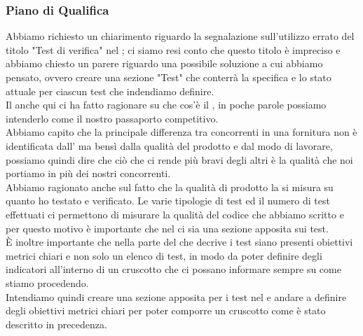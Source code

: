 	
	\subsubsection*{Piano di Qualifica}
	Abbiamo richiesto un chiarimento riguardo la segnalazione sull'utilizzo errato del titolo "Test di verifica" nel \PdQ ; ci siamo resi conto che questo titolo è impreciso e abbiamo chiesto un parere riguardo una possibile soluzione a cui abbiamo pensato, ovvero creare una sezione "Test" che conterrà la specifica e lo stato attuale per ciascun test che indendiamo definire. \\
	Il \TV{} anche qui ci ha fatto ragionare su che cos'è il \PdQ, in poche parole possiamo intenderlo come il nostro passaporto competitivo. \\
	Abbiamo capito che la principale differenza tra concorrenti in una fornitura non è identificata dall'\AdR{} ma bensì dalla qualità del prodotto e dal modo di lavorare, possiamo quindi dire che ciò che ci rende più bravi degli altri è la qualità che noi portiamo in più dei nostri concorrenti. \\
	Abbiamo ragionato anche sul fatto che la qualità di prodotto la si misura su quanto ho testato e verificato. Le varie tipologie di test ed il numero di test effettuati ci permettono di misurare la qualità del codice che abbiamo scritto e per questo motivo è importante che nel \PdQ{} ci sia una sezione apposita sui test. \\
	È inoltre importante che nella parte del \PdQ{} che decrive i test siano presenti obiettivi metrici chiari e non solo un elenco di test, in modo da poter definire degli indicatori all'interno di un cruscotto che ci possano informare sempre su come stiamo procedendo. \\
	Intendiamo quindi creare una sezione apposita per i test nel \PdQ{} e andare a definire degli obiettivi metrici chiari per poter comporre un cruscotto come è stato descritto in precedenza.
	
